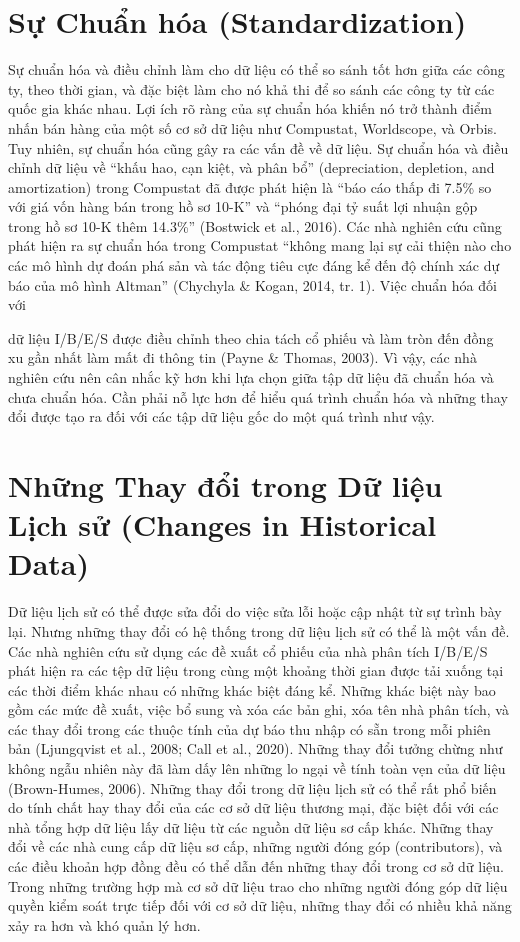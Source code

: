 \section{Sự Chuẩn hóa (Standardization)}

Sự chuẩn hóa và điều chỉnh làm cho dữ liệu có thể so sánh tốt hơn giữa các công ty, theo thời gian, và đặc biệt làm cho nó khả thi để so sánh các công ty từ các quốc gia khác nhau. Lợi ích rõ ràng của sự chuẩn hóa khiến nó trở thành điểm nhấn bán hàng của một số cơ sở dữ liệu như Compustat, Worldscope, và Orbis. Tuy nhiên, sự chuẩn hóa cũng gây ra các vấn đề về dữ liệu. Sự chuẩn hóa và điều chỉnh dữ liệu về ``khấu hao, cạn kiệt, và phân bổ'' (depreciation, depletion, and amortization) trong Compustat đã được phát hiện là ``báo cáo thấp đi 7.5\% so với giá vốn hàng bán trong hồ sơ 10-K'' và ``phóng đại tỷ suất lợi nhuận gộp trong hồ sơ 10-K thêm 14.3\%'' (Bostwick et al., 2016). Các nhà nghiên cứu cũng phát hiện ra sự chuẩn hóa trong Compustat ``không mang lại sự cải thiện nào cho các mô hình dự đoán phá sản và tác động tiêu cực đáng kể đến độ chính xác dự báo của mô hình Altman'' (Chychyla \& Kogan, 2014, tr. 1). Việc chuẩn hóa đối với

dữ liệu I/B/E/S được điều chỉnh theo chia tách cổ phiếu và làm tròn đến đồng xu gần nhất làm mất đi thông tin (Payne \& Thomas, 2003). Vì vậy, các nhà nghiên cứu nên cân nhắc kỹ hơn khi lựa chọn giữa tập dữ liệu đã chuẩn hóa và chưa chuẩn hóa. Cần phải nỗ lực hơn để hiểu quá trình chuẩn hóa và những thay đổi được tạo ra đối với các tập dữ liệu gốc do một quá trình như vậy.

\section{Những Thay đổi trong Dữ liệu Lịch sử (Changes in Historical Data)}

Dữ liệu lịch sử có thể được sửa đổi do việc sửa lỗi hoặc cập nhật từ sự trình bày lại. Nhưng những thay đổi có hệ thống trong dữ liệu lịch sử có thể là một vấn đề. Các nhà nghiên cứu sử dụng các đề xuất cổ phiếu của nhà phân tích I/B/E/S phát hiện ra các tệp dữ liệu trong cùng một khoảng thời gian được tải xuống tại các thời điểm khác nhau có những khác biệt đáng kể. Những khác biệt này bao gồm các mức đề xuất, việc bổ sung và xóa các bản ghi, xóa tên nhà phân tích, và các thay đổi trong các thuộc tính của dự báo thu nhập có sẵn trong mỗi phiên bản (Ljungqvist et al., 2008; Call et al., 2020). Những thay đổi tưởng chừng như không ngẫu nhiên này đã làm dấy lên những lo ngại về tính toàn vẹn của dữ liệu (Brown-Humes, 2006). Những thay đổi trong dữ liệu lịch sử có thể rất phổ biến do tính chất hay thay đổi của các cơ sở dữ liệu thương mại, đặc biệt đối với các nhà tổng hợp dữ liệu lấy dữ liệu từ các nguồn dữ liệu sơ cấp khác. Những thay đổi về các nhà cung cấp dữ liệu sơ cấp, những người đóng góp (contributors), và các điều khoản hợp đồng đều có thể dẫn đến những thay đổi trong cơ sở dữ liệu. Trong những trường hợp mà cơ sở dữ liệu trao cho những người đóng góp dữ liệu quyền kiểm soát trực tiếp đối với cơ sở dữ liệu, những thay đổi có nhiều khả năng xảy ra hơn và khó quản lý hơn.

